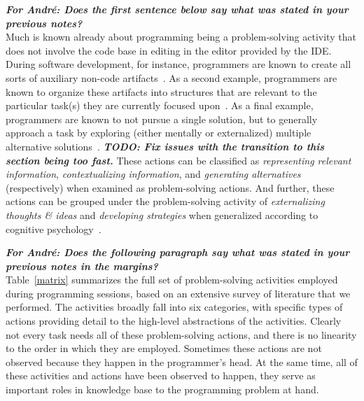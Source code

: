 \documentclass{ppig}
\newcommand{\todo}[1]{\textit{\textbf{\color{red}TODO: #1}}} %
\newcommand{\discuss}[1]{\textit{\textbf{\color{darkgreen}#1}}} %
\begin{document}
\discuss{For André: Does the first sentence below say what was stated in your previous notes?\\}
Much is known already about programming being a problem-solving activity that does not involve the code base in editing in the editor provided by the IDE.
During software development, for instance, programmers are known to create all sorts of auxiliary non-code artifacts~\cite{cherubini2007whiteboard}.
As a second example, programmers are known to organize these artifacts into structures that are relevant to the particular task(s) they are currently focused upon~\cite{baltes2016empirical}.
As a final example, programmers are known to not pursue a single solution, but to generally approach a task by exploring (either mentally or externalized) multiple alternative solutions~\cite{madeyski2017experimentation}.
\todo{Fix issues with the transition to this section being too fast.}
These actions can be classified as \textit{representing relevant information}, \textit{contextualizing information}, and \textit{generating alternatives} (respectively) when examined as problem-solving actions.
And further, these actions can be grouped under the problem-solving activity of \textit{externalizing thoughts \& ideas} and \textit{developing strategies} when generalized according to cognitive psychology~\cite{mayer1992thinking}.

\discuss{For André: Does the following paragraph say what was stated in your previous notes in the margins?\\}
Table~\ref{matrix} summarizes the full set of problem-solving activities employed during programming sessions, based on an extensive survey of literature that we performed.
The activities broadly fall into six categories, with specific types of actions providing detail to the high-level abstractions of the activities.
Clearly not every task needs all of these problem-solving actions, and there is no linearity to the order in which they are employed.
Sometimes these actions are not observed because they happen in the programmer's head.
At the same time, all of these activities and actions have been observed to happen, they serve as important roles in knowledge base to the programming problem at hand.
\end{document}
